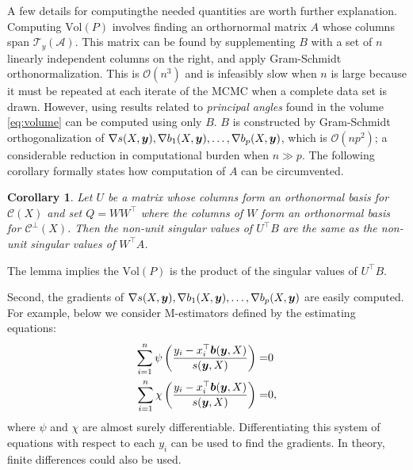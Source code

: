 \documentclass[12pt]{article}
\newcommand{\by}{\mbox{\boldmath $y$}}
\newcommand{\bb}{\mbox{\boldmath $b$}}
\newcommand{\mc}{\mathcal}
\newtheorem{corollary}[theorem]{\bf Corollary}
\begin{document}
A few details for computingthe needed quantities are worth further explanation. Computing $\text{Vol} (P)$ involves finding an orthornormal matrix $A$ whose columns span $\mc T_{y}(\mc A)$. This matrix can be found by supplementing $B$ with a set of $n$ linearly independent columns on the right, and apply Gram-Schmidt orthonormalization.  This is $\mc O(n^3)$ and is infeasibly slow when $n$ is large because it must be repeated at each iterate of the MCMC when a complete data set is drawn.  However, using results related to \textit{principal angles} found in \cite{miao1992} the volume \eqref{eq:volume} can be computed using only $B$. $B$ is constructed by Gram-Schmidt orthogonalization of $\nabla s(X,\by), \nabla b_1(X,\by),\dots, \nabla b_p(X,\by)$, which is  $\mc O(np^2)$;  a 
considerable reduction in computational burden when $n \gg p$. 
The following corollary formally states how computation of $A$ can be circumvented. 
\begin{corollary}
\label{theorem:sings}
Let $U$ be a matrix whose columns form an orthonormal basis for $\mc C (X)$ and set $Q=WW^{\top}$ where the columns of $W$ form an orthonormal basis for $\mc{C}^\perp(X)$. Then the non-unit singular values of $U^\top B$ are the same as the non-unit singular values of $W^\top A$.
\end{corollary} 
\noindent The lemma implies the $\text{Vol} (P)$ is the product of the singular values of $U^\top B$. 

Second, the gradients of $\nabla s(X,\by), \nabla b_1(X,\by),\dots, \nabla b_p(X,\by)$ are easily computed. For example, below we consider M-estimators defined by the estimating equations:
\begin{eqnarray}
\label{Mest}
 \sum_{i=1}^n \psi\left(\frac{y_i - x_{i}^{\top}\bb(\by,X)}{s(\by,X)}\right)= & 0 \\
 \sum_{i=1}^n \chi\left(\frac{y_i - x_{i}^{\top}\bb(\by,X)}{s(\by,X)}\right)= & 0, \nonumber 
\end{eqnarray} 
where $\psi$ and $\chi$ are almost surely differentiable. Differentiating this system of equations with respect to each $y_{i}$ can be used to find the gradients. In theory, finite differences could also be used. 
\end{document}
